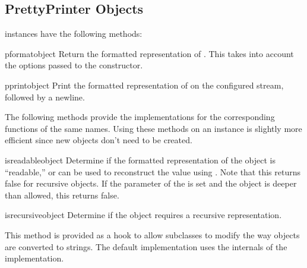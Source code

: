 \subsection{PrettyPrinter Objects}
\label{PrettyPrinter Objects}

 instances have the following methods:


\begin{methoddesc}{pformat}{object}
Return the formatted representation of .  This takes into
account the options passed to the  constructor.
\end{methoddesc}

\begin{methoddesc}{pprint}{object}
Print the formatted representation of  on the configured
stream, followed by a newline.
\end{methoddesc}

The following methods provide the implementations for the
corresponding functions of the same names.  Using these methods on an
instance is slightly more efficient since new 
objects don't need to be created.

\begin{methoddesc}{isreadable}{object}
Determine if the formatted representation of the object is
``readable,'' or can be used to reconstruct the value using
.  Note that this returns false for
recursive objects.  If the  parameter of the
 is set and the object is deeper than allowed,
this returns false.
\end{methoddesc}

\begin{methoddesc}{isrecursive}{object}
Determine if the object requires a recursive representation.
\end{methoddesc}

This method is provided as a hook to allow subclasses to modify the
way objects are converted to strings.  The default implementation uses
the internals of the  implementation.

